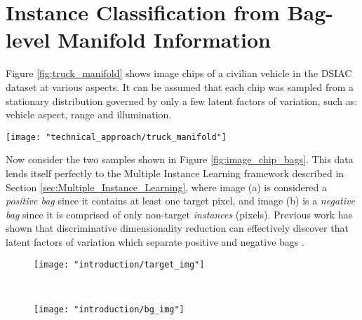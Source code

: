 \section{Instance Classification from Bag-level Manifold Information} \label{sec:instance_class_bag_level_info}
Figure \ref{fig:truck_manifold} shows image chips of a civilian vehicle in the DSIAC \citep{DSIACATR} dataset at various aspects.  It can be assumed that each chip was sampled from a stationary distribution governed by only a few latent factors of variation, such as: vehicle aspect, range and illumination. 
\begin{center}
	\begin{figure*}[h]
		\centering
		\texttt{[image: "technical\_approach/truck\_manifold"]}
		\caption[Target image variation]{Image chips of a target vehicle in the DSIAC \citep{DSIACATR} dataset.  The chips show the same target at various aspects.}
		\label{fig:truck_manifold}
	\end{figure*}
\end{center}
\noindent Now consider the two samples shown in Figure \ref{fig:image_chip_bags}.  This data lends itself perfectly to the Multiple Instance Learning framework described in Section \ref{sec:Multiple_Instance_Learning}, where image (a) is considered a \textit{positive bag} since it contains at least one target pixel, and image (b) is a \textit{negative bag} since it is comprised of only non-target \textit{instances} (pixels).  Previous work has shown that discriminative dimensionality reduction can effectively discover that latent factors of variation which separate positive and negative bags \citep{Sun2010MIDR, Ping2010MILDRMaxMargin, Chai2014MIDA, Kim2010LocalDRMIL}.  

\begin{figure*}[h]
	\centering
	\begin{subfigure}[t]{0.5\textwidth}
		\centering
		\texttt{[image: "introduction/target\_img"]}
		\caption{}
	\end{subfigure}%
	~ 
	\begin{subfigure}[t]{0.5\textwidth}
		\centering
		\texttt{[image: "introduction/bg\_img"]}
		\caption{}
	\end{subfigure}
	\caption[Examples of DSIAC bags.]{Example of image-level labels for binary target detection.  Image (a) is denoted to contain pixels belonging to the target class somewhere within the image, while image (b) clearly contains samples solely from the background distribution.}
	\label{fig:image_chip_bags}%
\end{figure*}

